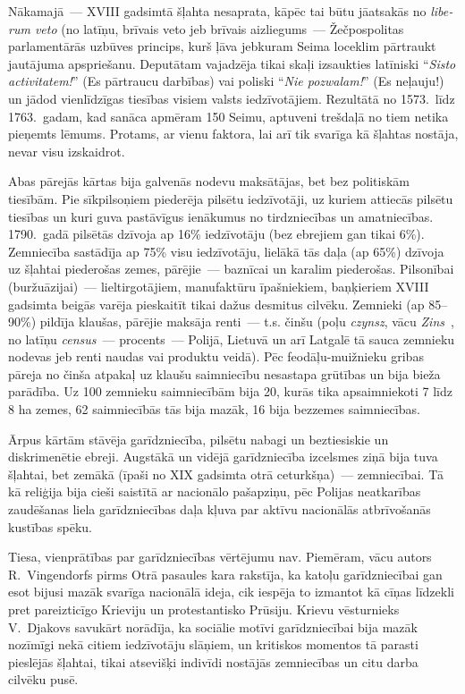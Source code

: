 \documentclass[twoside,a5paper,12pt,fleqn,openany]{extbook}
\newcommand{\pltxti}[1]{\textit{\textpolish{#1}}}
\newcommand{\detxti}[1]{\textit{\textgerman{#1}}}
\newcommand{\latxti}[1]{\textit{\textlatin{#1}}}
\begin{document}
Nākamajā~--- XVIII gadsimtā šļahta nesaprata, kāpēc tai būtu jāatsakās no \latxti{liberum veto} (no latīņu, brīvais veto jeb brīvais aizliegums~--- Žečpospolitas parlamentārās uzbūves princips, kurš ļāva jebkuram Seima loceklim pārtraukt jautājuma apspriešanu. Deputātam vajadzēja tikai skaļi izsaukties latīniski ``\latxti{Sisto activitatem!}'' (Es pārtraucu darbības) vai poliski ``\pltxti{Nie pozwalam!}'' (Es neļauju!) un jādod vienlīdzīgas tiesības visiem valsts iedzīvotājiem. Rezultātā no 1573.~līdz 1763.~gadam, kad sanāca apmēram 150 Seimu, aptuveni trešdaļā no tiem netika pieņemts lēmums. Protams, ar vienu faktora, lai arī tik svarīga kā šļahtas nostāja, nevar visu izskaidrot.

Abas pārejās kārtas bija galvenās nodevu maksātājas, bet bez politiskām tiesībām. Pie sīkpilsoņiem piederēja pilsētu iedzīvotāji, uz kuriem attiecās pilsētu tiesības un kuri guva pastāvīgus ienākumus no tirdzniecības un amatniecības. 1790.~gadā pilsētās dzīvoja ap 16\% iedzīvotāju (bez ebrejiem gan tikai 6\%). Zemniecība sastādīja ap 75\% visu iedzīvotāju, lielākā tās daļa (ap 65\%) dzīvoja uz šļahtai piederošas zemes, pārējie~--- baznīcai un karalim piederošas. Pilsonībai (buržuāzijai)~--- lieltirgotājiem, manufaktūru īpašniekiem, baņķieriem XVIII gadsimta beigās varēja pieskaitīt tikai dažus desmitus cilvēku. Zemnieki (ap 85--90\%) pildīja klaušas, pārējie maksāja renti~--- t.s. činšu (poļu \pltxti{czynsz}, vācu \detxti{Zins}~, no latīņu \latxti{census}~--- procents~--- Polijā, Lietuvā un arī Latgalē tā sauca zemnieku nodevas jeb renti naudas vai produktu veidā). Pēc feodāļu-muižnieku gribas pāreja no činša atpakaļ uz klaušu saimniecību nesastapa grūtības un bija bieža parādība. Uz 100 zemnieku saimniecībām bija 20, kurās tika apsaimniekoti 7 līdz 8 ha zemes, 62 saimniecībās tās bija mazāk, 16 bija bezzemes saimniecības.

Ārpus kārtām stāvēja garīdzniecība, pilsētu nabagi un beztiesiskie un diskrimenētie ebreji. Augstākā un vidējā garīdzniecība izcelsmes ziņā bija tuva šļahtai, bet zemākā (īpaši no XIX gadsimta otrā ceturkšņa)~--- zemniecībai. Tā kā reliģija bija cieši saistītā ar nacionālo pašapziņu, pēc Polijas neatkarības zaudēšanas liela garīdzniecības daļa kļuva par aktīvu nacionālās atbrīvošanās kustības spēku.

Tiesa, vienprātības par garīdzniecības vērtējumu nav. Piemēram, vācu autors R.~Vingendorfs pirms Otrā pasaules kara rakstīja, ka katoļu garīdzniecībai gan esot bijusi mazāk svarīga nacionālā ideja, cik iespēja to izmantot kā cīņas līdzekli pret pareizticīgo Krieviju un protestantisko Prūsiju. Krievu vēsturnieks V.~Djakovs savukārt norādīja, ka sociālie motīvi garīdzniecībai bija mazāk nozīmīgi nekā citiem iedzīvotāju slāņiem, un kritiskos momentos tā parasti pieslējās šļahtai, tikai atsevišķi indivīdi nostājās zemniecības un citu darba cilvēku pusē.
\end{document}
